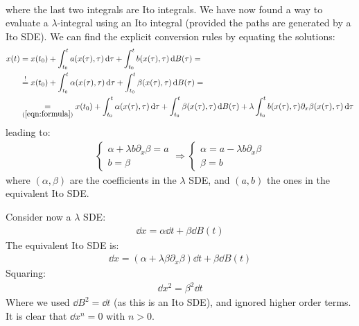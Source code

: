 \documentclass[../template.tex]{subfiles}
\begin{document}
\begin{exo}
\begin{align}
    \end{align}
    where the last two integrals are Ito integrals. We have now found a way to evaluate a $\lambda$-integral using an Ito integral (provided the paths are generated by a Ito SDE). We can find the explicit conversion rules by equating the solutions:
    \begin{align*}
        x(t) &= x(t_0) + \int_{t_0}^t a(x(\tau), \tau) \dd{\tau} + \int_{t_0}^t b(x(\tau), \tau) \dd{B(\tau)} =\\
        &\overset{!}{=} x(t_0) + \int_{t_0}^t \alpha(x(\tau), \tau) \dd{\tau} + \int_{t_0}^t \beta(x(\tau), \tau) \dd{B(\tau)} =\\
        &\underset{(\ref{eqn:formula})}{=} x(t_0) + \int_{t_0}^t \alpha(x(\tau), \tau) \dd{\tau} + \int_{t_0}^t \beta(x(\tau), \tau) \dd{B(\tau)} + \lambda \int_{t_0}^t b(x(\tau), \tau) \partial_x \beta(x(\tau), \tau) \dd{\tau}
    \end{align*} 
    leading to:
    \begin{align*}
        \begin{cases}
            \alpha + \lambda b \partial_x \beta = a\\
            b = \beta
        \end{cases} \Rightarrow \begin{cases}
            \alpha = a - \lambda b \partial_x \beta\\
            \beta = b
        \end{cases}
    \end{align*}
    where $(\alpha, \beta)$ are the coefficients in the $\lambda$ SDE, and $(a,b)$ the ones in the equivalent Ito SDE.
    
    Consider now a $\lambda$ SDE:
    \begin{align*}
        \dd{x} = \alpha \dd{t} + \beta \dd{B(t)}
    \end{align*}
    The equivalent Ito SDE is:
    \begin{align}\label{eqn:newdx}
        \dd{x} = (\alpha + \lambda \beta \partial_x \beta) \dd{t} + \beta \dd{B(t)}
    \end{align}
    Squaring:
    \begin{align*}
        \dd{x}^2 = \beta^2 \dd{t}
    \end{align*}
    Where we used $\dd{B}^2 = \dd{t}$ (as this is an Ito SDE), and ignored higher order terms. It is clear that $\dd{x}^n = 0$ with $n > 0$.
    

\end{exo}
\end{document}
